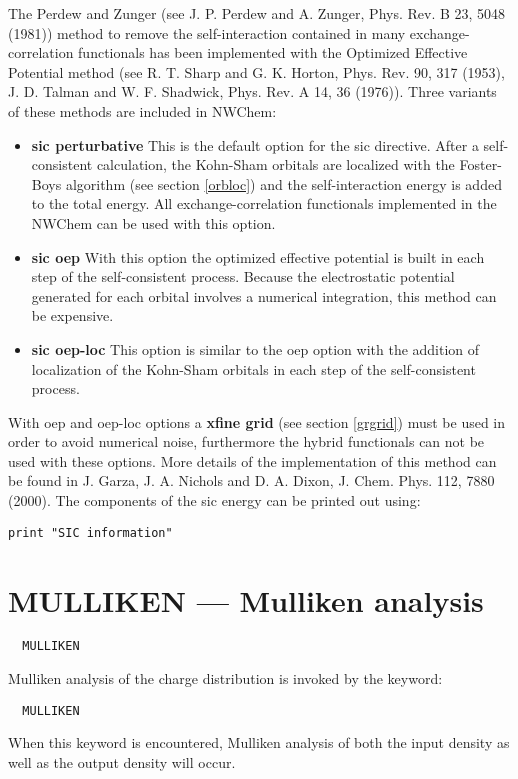 The Perdew and Zunger (see J. P. Perdew and A. Zunger, Phys. Rev. B 23,
5048 (1981)) method to remove the self-interaction contained in many
exchange-correlation functionals has been implemented with the
Optimized Effective Potential method 
(see R. T. Sharp and G. K. Horton, Phys. Rev. 90, 317 (1953),
J. D. Talman and W. F. Shadwick, Phys. Rev. A 14, 36 (1976)). 
Three variants of these methods are included in NWChem:
\begin{itemize}
\item{\bf sic perturbative} This is the default option for the sic
directive. After a self-consistent calculation, the Kohn-Sham
orbitals are localized with the Foster-Boys algorithm (see section
\ref{orbloc}) and the self-interaction energy is added to the total energy. 
All exchange-correlation functionals implemented in the NWChem can be
used with this option.
\item{\bf sic oep} With this option the optimized effective potential is
built in each step of the self-consistent process. Because the electrostatic
potential generated for each orbital involves a numerical
integration, this method can be expensive.
\item{\bf sic oep-loc} This option is similar to the oep option with the
addition of localization of the Kohn-Sham orbitals in each step of the 
self-consistent process.
\end{itemize}
With oep and oep-loc options a {\bf xfine grid} (see section \ref{grgrid})
must be used in order to avoid numerical noise, furthermore the hybrid 
functionals can not be used with these options.  More details of the
implementation of this method can be found in 
J. Garza, J. A. Nichols and D. A. Dixon, J. Chem. Phys. 112, 7880 (2000). 
The components of the sic energy can be printed out using:

\begin{verbatim}
print "SIC information"
\end{verbatim}


\section{MULLIKEN --- Mulliken analysis}
\begin{verbatim}
  MULLIKEN
\end{verbatim}

Mulliken analysis of the charge distribution is invoked by the keyword:
\begin{verbatim}
  MULLIKEN
\end{verbatim}
When this keyword is encountered, Mulliken analysis of both the input 
density as well as the output density will occur.

